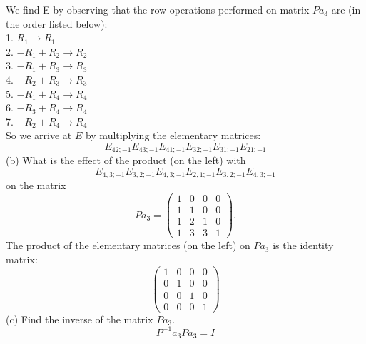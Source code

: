 \documentclass[12pt]{article}
\begin{document}
We find E by observing that the row operations performed on matrix $Pa_3$ are (in the order listed below):\\
1. $R_1 \rightarrow R_1$\\
2. $-R_1 + R_2  \rightarrow R_2$\\
3. $-R_1 + R_3  \rightarrow R_3$\\
4. $-R_2 + R_3  \rightarrow R_3$\\
5. $-R_1 + R_4  \rightarrow R_4$\\
6. $-R_3 + R_4  \rightarrow R_4$\\
7. $-R_2 + R_4  \rightarrow R_4$\\
So we arrive at $E$ by multiplying the elementary matrices:
$$E_{42;-1}E_{43;-1}E_{41;-1}E_{32;-1}E_{31;-1}E_{21;-1}$$
\medskip
(b)
What is the effect of the product (on the left) with
\[
E_{4, 3; -1} E_{3, 2; -1} E_{4, 3; -1} E_{2, 1; -1} E_{3, 2; -1} E_{4, 3; -1}
\]
on the matrix 
\[
Pa_3 = 
\begin{pmatrix}
1 & 0 & 0 & 0 \\
1 & 1 & 0 & 0 \\
1 & 2 & 1 & 0 \\
1 & 3 & 3 & 1
\end{pmatrix}.
\]
The product of the elementary matrices (on the left) on $Pa_3$ is the identity matrix: 
\[\begin{pmatrix}
1&0 &0& 0\\0 & 1 & 0 & 0 \\ 0 & 0 & 1 & 0 \\0 & 0 & 0 & 1
\end{pmatrix}\]
\medskip
(c)
Find the inverse of the matrix $Pa_3$.
$$P^{-1}a_3Pa_3 = I$$
\end{document}
